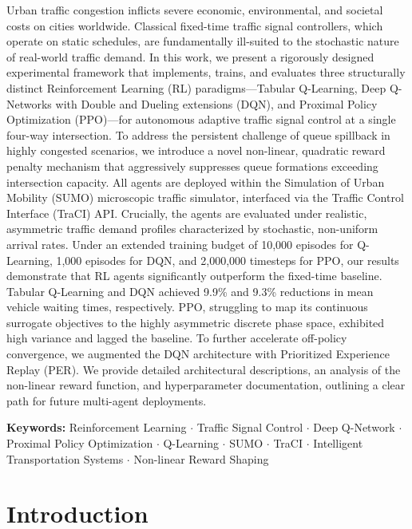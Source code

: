 \documentclass[10pt,a4paper]{article}
\begin{document}
Urban traffic congestion inflicts severe economic, environmental, and societal costs on cities worldwide. Classical fixed-time traffic signal controllers, which operate on static schedules, are fundamentally ill-suited to the stochastic nature of real-world traffic demand. In this work, we present a rigorously designed experimental framework that implements, trains, and evaluates three structurally distinct Reinforcement Learning (RL) paradigms---Tabular Q-Learning, Deep Q-Networks with Double and Dueling extensions (DQN), and Proximal Policy Optimization (PPO)---for autonomous adaptive traffic signal control at a single four-way intersection. To address the persistent challenge of queue spillback in highly congested scenarios, we introduce a novel non-linear, quadratic reward penalty mechanism that aggressively suppresses queue formations exceeding intersection capacity. All agents are deployed within the Simulation of Urban Mobility (SUMO) microscopic traffic simulator, interfaced via the Traffic Control Interface (TraCI) API. Crucially, the agents are evaluated under realistic, asymmetric traffic demand profiles characterized by stochastic, non-uniform arrival rates. Under an extended training budget of 10,000 episodes for Q-Learning, 1,000 episodes for DQN, and 2,000,000 timesteps for PPO, our results demonstrate that RL agents significantly outperform the fixed-time baseline. Tabular Q-Learning and DQN achieved 9.9\% and 9.3\% reductions in mean vehicle waiting times, respectively. PPO, struggling to map its continuous surrogate objectives to the highly asymmetric discrete phase space, exhibited high variance and lagged the baseline. To further accelerate off-policy convergence, we augmented the DQN architecture with Prioritized Experience Replay (PER). We provide detailed architectural descriptions, an analysis of the non-linear reward function, and hyperparameter documentation, outlining a clear path for future multi-agent deployments.

\textbf{Keywords:} Reinforcement Learning $\cdot$ Traffic Signal Control $\cdot$ Deep Q-Network $\cdot$ Proximal Policy Optimization $\cdot$ Q-Learning $\cdot$ SUMO $\cdot$ TraCI $\cdot$ Intelligent Transportation Systems $\cdot$ Non-linear Reward Shaping

\section{Introduction}
\end{document}
